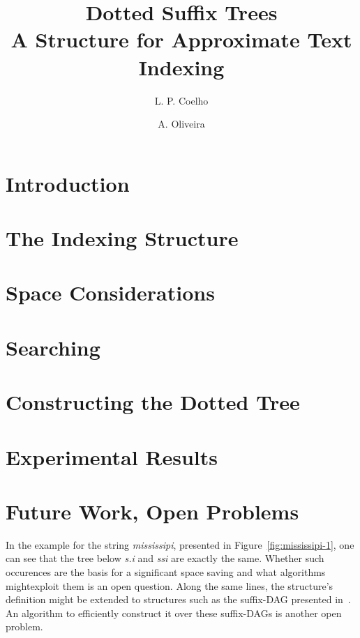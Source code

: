 \documentclass[a4paper,10pt]{article}
\title{Dotted Suffix Trees\\A Structure for Approximate Text Indexing}
\author{L. P. Coelho \and A. Oliveira}
\newcommand{\putstring}[1]{\textsl{#1}}
\begin{document}
\maketitle

\begin{abstract}

\end{abstract}

\section{Introduction}


\section{The Indexing Structure}

\section{Space Considerations}

\section{Searching}

\section{Constructing the Dotted Tree}

\section{Experimental Results}

\section{Future Work, Open Problems}

In the example for the string \putstring{mississipi}, presented in Figure~\ref{fig:mississipi-1}, one can see that the tree below \putstring{s.i} and \putstring{ssi} are exactly the same. Whether such occurences are the basis for a significant space saving and what algorithms mightexploit them is an open question.
Along the same lines, the structure's definition might be extended to structures such as the suffix-DAG presented in~\cite[7.7]{gusfield:algorithms}. An algorithm to efficiently construct it over these suffix-DAGs is another open problem.



\end{document}
